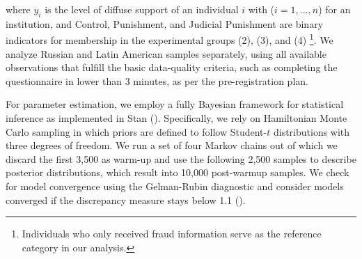 \documentclass[11pt, ngerman,english,a4]{article}
\begin{document}
\noindent where $y_i$ is the level of diffuse support of an individual $i$ with ($i=1,...,n$) for an institution, and Control, Punishment, and Judicial Punishment are binary indicators for membership in the experimental groups (2),  (3), and (4) \footnote{Individuals who only received fraud information serve as the reference category in our analysis.}. We analyze Russian and Latin American samples separately, using all available observations that fulfill the basic data-quality criteria, such as completing the questionnaire in lower than 3 minutes, as per the pre-registration plan. 

For parameter estimation, we employ a fully Bayesian framework for statistical inference as implemented in Stan (\citealt{StanDevelopmentTeam2020}). 
Specifically, we rely on Hamiltonian Monte Carlo sampling in which priors are defined to follow Student-$t$ distributions with three degrees of freedom.
We run a set of four Markov chains out of which we discard the first 3,500 as warm-up and use the following 2,500 samples to describe posterior distributions, which result into 10,000 post-warmup samples. We check for model convergence using the Gelman-Rubin diagnostic and consider models converged if the discrepancy measure stays below 1.1 (\citealt{Gelman2004}).



\end{document}
